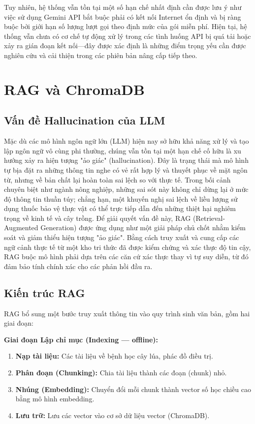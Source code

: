 Tuy nhiên, hệ thống vẫn tồn tại một số hạn chế nhất định cần được lưu ý như việc sử dụng Gemini API bắt buộc phải có kết nối Internet ổn định và bị ràng buộc bởi giới hạn số lượng lượt gọi theo định mức của gói miễn phí. Hiện tại, hệ thống vẫn chưa có cơ chế tự động xử lý trong các tình huống API bị quá tải hoặc xảy ra gián đoạn kết nối—đây được xác định là những điểm trọng yếu cần được nghiên cứu và cải thiện trong các phiên bản nâng cấp tiếp theo.

\section{RAG và ChromaDB}

\subsection{Vấn đề Hallucination của LLM}
Mặc dù các mô hình ngôn ngữ lớn (LLM) hiện nay sở hữu khả năng xử lý và tạo lập ngôn ngữ vô cùng phi thường, chúng vẫn tồn tại một hạn chế cố hữu là xu hướng xảy ra hiện tượng "ảo giác" (hallucination). Đây là trạng thái mà mô hình tự bịa đặt ra những thông tin nghe có vẻ rất hợp lý và thuyết phục về mặt ngôn từ, nhưng về bản chất lại hoàn toàn sai lệch so với thực tế. Trong bối cảnh chuyên biệt như ngành nông nghiệp, những sai sót này không chỉ dừng lại ở mức độ thông tin thuần túy; chẳng hạn, một khuyến nghị sai lệch về liều lượng sử dụng thuốc bảo vệ thực vật có thể trực tiếp dẫn đến những thiệt hại nghiêm trọng về kinh tế và cây trồng. 
\newpage Để giải quyết vấn đề này, RAG (Retrieval-Augmented Generation) được ứng dụng như một giải pháp chủ chốt nhằm kiểm soát và giảm thiểu hiện tượng "ảo giác". Bằng cách truy xuất và cung cấp các ngữ cảnh thực tế từ một kho tri thức đã được kiểm chứng và xác thực độ tin cậy, RAG buộc mô hình phải dựa trên các căn cứ xác thực thay vì tự suy diễn, từ đó đảm bảo tính chính xác cho các phản hồi đầu ra.

\subsection{Kiến trúc RAG}
RAG bổ sung một bước truy xuất thông tin vào quy trình sinh văn bản, gồm hai giai đoạn:

\textbf{Giai đoạn Lập chỉ mục (Indexing --- offline):}
\begin{enumerate}[leftmargin=1.5cm]
    \item \textbf{Nạp tài liệu:} Các tài liệu về bệnh học cây lúa, phác đồ điều trị.
    \item \textbf{Phân đoạn (Chunking):} Chia tài liệu thành các đoạn (chunk) nhỏ.
    \item \textbf{Nhúng (Embedding):} Chuyển đổi mỗi chunk thành vector số học chiều cao bằng mô hình embedding.
    \item \textbf{Lưu trữ:} Lưu các vector vào cơ sở dữ liệu vector (ChromaDB).
\end{enumerate}

